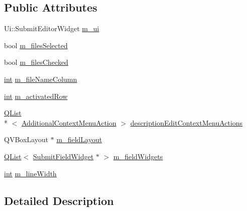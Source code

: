 \subsection*{Public Attributes}
\begin{DoxyCompactItemize}
\item 
Ui\-::\-Submit\-Editor\-Widget \hyperlink{struct_utils_1_1_submit_editor_widget_private_a5476c01db3bc97951db656048ab0c0c8}{m\-\_\-ui}
\item 
bool \hyperlink{struct_utils_1_1_submit_editor_widget_private_ae84602f3befda38e44858e5cc60f79be}{m\-\_\-files\-Selected}
\item 
bool \hyperlink{struct_utils_1_1_submit_editor_widget_private_aeb1241360fb4385d02bd11f12192dc51}{m\-\_\-files\-Checked}
\item 
\hyperlink{ioapi_8h_a787fa3cf048117ba7123753c1e74fcd6}{int} \hyperlink{struct_utils_1_1_submit_editor_widget_private_ab07726bb11a9c52f9a0915170c6bb0fd}{m\-\_\-file\-Name\-Column}
\item 
\hyperlink{ioapi_8h_a787fa3cf048117ba7123753c1e74fcd6}{int} \hyperlink{struct_utils_1_1_submit_editor_widget_private_a6827b630168b2e2696d7409ecfbb179f}{m\-\_\-activated\-Row}
\item 
\hyperlink{class_q_list}{Q\-List}\\*
$<$ \hyperlink{struct_utils_1_1_submit_editor_widget_private_adb3c92b95990f75654e9c25101be736d}{Additional\-Context\-Menu\-Action} $>$ \hyperlink{struct_utils_1_1_submit_editor_widget_private_a789ad5be9463cbc80cdd09e3575050ca}{description\-Edit\-Context\-Menu\-Actions}
\item 
Q\-V\-Box\-Layout $\ast$ \hyperlink{struct_utils_1_1_submit_editor_widget_private_aec37bbec70dab7d4c0cf949fac9d2433}{m\-\_\-field\-Layout}
\item 
\hyperlink{class_q_list}{Q\-List}$<$ \hyperlink{class_utils_1_1_submit_field_widget}{Submit\-Field\-Widget} $\ast$ $>$ \hyperlink{struct_utils_1_1_submit_editor_widget_private_abde8ff2c29d77121652458c01a6146d9}{m\-\_\-field\-Widgets}
\item 
\hyperlink{ioapi_8h_a787fa3cf048117ba7123753c1e74fcd6}{int} \hyperlink{struct_utils_1_1_submit_editor_widget_private_a26a9f360cbc9440cbbdcb9f5b9897807}{m\-\_\-line\-Width}
\end{DoxyCompactItemize}


\subsection{Detailed Description}


